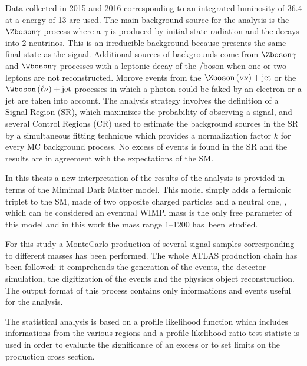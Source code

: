 Data collected in 2015 and 2016 corresponding to an integrated luminosity of \SI{36.4}{\ifb} at a \cm energy of \SI{13}{\tev} are used. The main background source for the \mph analysis is the $\Zboson\gamma$ process where a $\gamma$ is produced by initial state radiation and the \Zboson decays into 2 neutrinos. This is an irreducible background because presents the same final state as the signal. Additional sources of backgrounds come from $\Zboson\gamma$ and $\Wboson\gamma$ processes with a leptonic decay of the \Zboson/\Wboson boson when one or two leptons are not reconstructed. Morove events from the $\Zboson\left(\nu\nu\right)+\text{jet}$ or the $\Wboson\left(\ell\nu\right)+\text{jet}$ processes in which a photon could be faked by an electron or a jet are taken into account. The analysis strategy involves the definition of a Signal Region (SR), which maximizes the probability of observing a signal, and several Control Regions (CR) used to estimate the background sources in the SR by a simultaneous fitting technique which provides a normalization factor $k$ for every MC background process. No excess of events is found in the SR and the results are in agreement with the expectations of the SM.

In this thesis a new interpretation of the results of the \mph analysis is provided in terms of the Mimimal Dark Matter model. This model simply adds a fermionic triplet to the SM, made of two opposite charged particles \chipm and a neutral one, \chizero, which can be considered an eventual WIMP. \chizero mass is the only free parameter of this model and in this work the mass range \SIrange{1}{1200}{\gev} \mbox{has been studied}.
  
For this study a MonteCarlo production of several signal samples corresponding to different \chizero masses has been performed. The whole ATLAS production chain has been followed: it comprehends the generation of the events, the detector simulation, the digitization of the events and the physiscs object reconstruction. The output format of this process contains only informations and events useful for the \mph analysis. 

The statistical analysis is based on a profile likelihood function which includes informations from the various regions and a profile likelihood ratio test statistc is used in order to evaluate the significance of an excess or to set limits on the production cross section.

